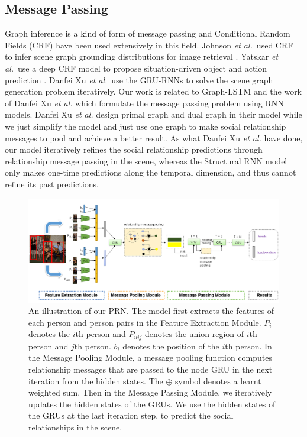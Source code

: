 \documentclass{article}
\newcommand{\PRN}{{\sf PRN}}
\newcommand{\etal}{{\it et al.}}
\begin{document}
\subsection{Message Passing}%
Graph inference is a kind of form of message passing and Conditional Random Fields (CRF) have been used extensively in this field. Johnson \etal \ used CRF to infer scene graph grounding distributions for image retrieval \cite{DBLP:conf/cvpr/JohnsonKSLSBL15}. Yatskar \etal \ use a deep CRF model to propose situation-driven object and action prediction\cite{DBLP:conf/cvpr/YatskarZF16} . Danfei Xu \etal \ use the GRU-RNNs to solve the scene graph generation problem iteratively\cite{DBLP:conf/cvpr/XuZCF17}. Our work is related to Graph-LSTM \cite{DBLP:conf/eccv/LiangSFLY16} and  the work of  Danfei Xu \etal \cite{DBLP:conf/cvpr/XuZCF17} which formulate the message passing problem using RNN models. Danfei Xu \etal \cite{DBLP:conf/cvpr/XuZCF17} design primal graph and dual graph in their model while we just simplify the model and just use one graph to make social relationship messages to pool and achieve a better result. As what Danfei Xu \etal \cite{DBLP:conf/cvpr/XuZCF17} have done, our model iteratively refines the social relationship predictions through relationship message passing in the scene, whereas the Structural RNN model only makes one-time predictions along the temporal dimension, and thus cannot refine its past predictions\cite{DBLP:conf/cvpr/XuZCF17}.

\vspace*{-3mm}
\begin{figure}[htpb]
	\centering
	\includegraphics[width=0.96 \textwidth,clip]{./pic/model_2.png}
	\caption{An illustration of our \PRN . The model first extracts the features of each person and person pairs in the Feature Extraction Module. $P_i$ denotes the $i$th person and $P_{uij}$ denotes the union region of $i$th person and $j$th person. $b_i$ denotes the position of the $i$th person. In the Message Pooling Module, a message pooling function computes relationship messages that are passed to the node GRU in the next iteration from the hidden states. The $\oplus$ symbol denotes a learnt weighted sum. Then in the Message Passing Module, we iteratively updates the hidden states of the GRUs. We use the hidden states of the GRUs at the last iteration step, to predict the social relationships in the scene.}
	\vspace*{-3.5mm}
	\label{example}
\end{figure}
\end{document}
